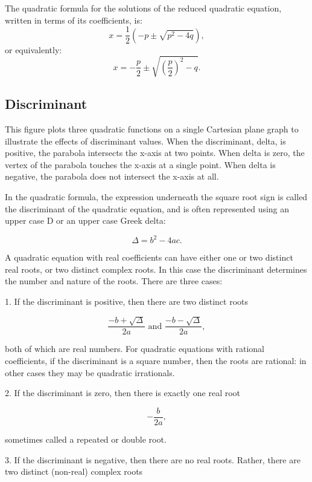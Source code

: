 The quadratic formula for the solutions of the reduced quadratic equation, written in
terms of its coefficients, is:
\[
x = \frac{1}{2} \left(-p \pm \sqrt{p^2 - 4q}\right),
\]
or equivalently:
\[
x = -\frac{p}{2} \pm \sqrt{\left(\frac{p}{2}\right)^2 - q}.
\]

\subsection{Discriminant}
\label{sss:disc-db3e}

This figure plots three quadratic functions on a single Cartesian plane graph to
illustrate the effects of discriminant values. When the discriminant, delta, is positive,
the parabola intersects the x-axis at two points. When delta is zero, the vertex of the
parabola touches the x-axis at a single point. When delta is negative, the parabola does
not intersect the x-axis at all.


In the quadratic formula, the expression underneath the square root sign is called the
discriminant of the quadratic equation, and is often represented using an upper case D or
an upper case Greek delta:

\[
\Delta = b^2 - 4ac.
\]

A quadratic equation with real coefficients can have either one or two distinct real
roots, or two distinct complex roots. In this case the discriminant determines the number
and nature of the roots. There are three cases:

1. If the discriminant is positive, then there are two distinct roots

   \[
\frac{-b + \sqrt{\Delta}}{2a} \text{ and } \frac{-b - \sqrt{\Delta}}{2a},
\]

both of which are real numbers. For quadratic equations with rational coefficients, if the
discriminant is a square number, then the roots are rational: in other cases they may be
quadratic irrationals.

2. If the discriminant is zero, then there is exactly one real root

   \[
-\frac{b}{2a},
\]

sometimes called a repeated or double root.

3. If the discriminant is negative, then there are no real roots. Rather, there are two
distinct (non-real) complex roots

